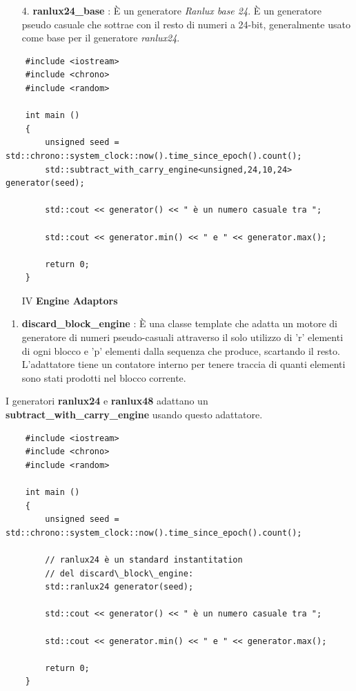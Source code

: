 \begin{enumerate}
	\item[4.] \textsf{\small \textbf{ranlux24\_base} : È un generatore \emph{Ranlux base 24}. È un generatore pseudo casuale che sottrae con il resto di numeri a 24-bit, generalmente usato come base per il generatore \emph{ranlux24}.} \\
\end{enumerate}

\begin{lstlisting}
	#include <iostream>
	#include <chrono>
	#include <random>
	
	int main ()
	{	
		unsigned seed = std::chrono::system_clock::now().time_since_epoch().count();
		std::subtract_with_carry_engine<unsigned,24,10,24> generator(seed);
		
		std::cout << generator() << " è un numero casuale tra ";
		
		std::cout << generator.min() << " e " << generator.max();
		
		return 0;
	}
\end{lstlisting}

\begin{enumerate}[I]
	\item[IV] \textsf{\small \textbf{Engine Adaptors}} \\
\end{enumerate}

\begin{enumerate}
	\item \textsf{\small \textbf{discard\_block\_engine} : È una classe template che adatta un motore di generatore di numeri pseudo-casuali attraverso il solo utilizzo di 'r' elementi di ogni blocco e 'p' elementi dalla sequenza che produce, scartando il resto. L'adattatore tiene un contatore interno per tenere traccia di quanti elementi sono stati prodotti nel blocco corrente.}
\end{enumerate}

\textsf{\small I generatori \textbf{ranlux24} e \textbf{ranlux48} adattano un \textbf{subtract\_with\_carry\_engine} usando questo adattatore.} \\

\begin{lstlisting}
	#include <iostream>
	#include <chrono>
	#include <random>
	
	int main ()
	{
		unsigned seed = std::chrono::system_clock::now().time_since_epoch().count();
		
		// ranlux24 è un standard instantitation
		// del discard\_block\_engine:
		std::ranlux24 generator(seed);
		
		std::cout << generator() << " è un numero casuale tra ";
		
		std::cout << generator.min() << " e " << generator.max();
		
		return 0;
	}
\end{lstlisting}

